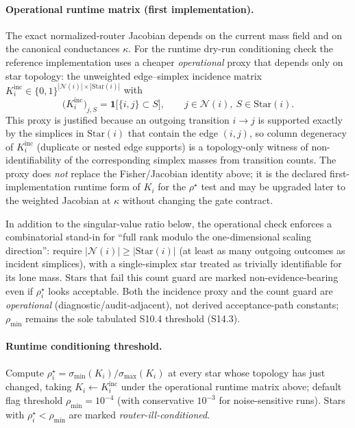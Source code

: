 \documentclass[11pt]{article}
\begin{document}
\paragraph{Operational runtime matrix (first implementation).}
\label{par:si-star-runtime-matrix}
The exact normalized-router Jacobian depends on the current mass field and on the canonical conductances $\kappa$. For the runtime dry-run conditioning check the reference implementation uses a cheaper \emph{operational} proxy that depends only on star topology: the unweighted edge--simplex incidence matrix $K_i^{\mathrm{inc}}\in\{0,1\}^{|\mathcal N(i)|\times|\mathrm{Star}(i)|}$ with
\[
\bigl(K_i^{\mathrm{inc}}\bigr)_{j,S}
=
\mathbf 1\bigl[\{i,j\}\subset S\bigr],
\qquad
j\in\mathcal N(i),\ S\in\mathrm{Star}(i).
\]
This proxy is justified because an outgoing transition $i\to j$ is supported exactly by the simplices in $\mathrm{Star}(i)$ that contain the edge $(i,j)$, so column degeneracy of $K_i^{\mathrm{inc}}$ (duplicate or nested edge supports) is a topology-only witness of non-identifiability of the corresponding simplex masses from transition counts. The proxy does \emph{not} replace the Fisher/Jacobian identity above; it is the declared first-implementation runtime form of $K_i$ for the $\rho^\star$ test and may be upgraded later to the weighted Jacobian at $\kappa$ without changing the gate contract.

In addition to the singular-value ratio below, the operational check enforces a combinatorial stand-in for ``full rank modulo the one-dimensional scaling direction'': require $|\mathcal N(i)|\ge|\mathrm{Star}(i)|$ (at least as many outgoing outcomes as incident simplices), with a single-simplex star treated as trivially identifiable for its lone mass. Stars that fail this count guard are marked non-evidence-bearing even if $\rho_i^\star$ looks acceptable. Both the incidence proxy and the count guard are \emph{operational} (diagnostic/audit-adjacent), not derived acceptance-path constants; $\rho_{\min}$ remains the sole tabulated S10.4 threshold (S14.3).

\paragraph{Runtime conditioning threshold.}
Compute $\rho_i^\star=\sigma_{\min}(K_i)/\sigma_{\max}(K_i)$ at every star whose topology has just changed, taking $K_i\leftarrow K_i^{\mathrm{inc}}$ under the operational runtime matrix above; default flag threshold $\rho_{\min}=10^{-4}$ (with conservative $10^{-3}$ for noise-sensitive runs). Stars with $\rho_i^\star<\rho_{\min}$ are marked \emph{router-ill-conditioned}.
\end{document}
